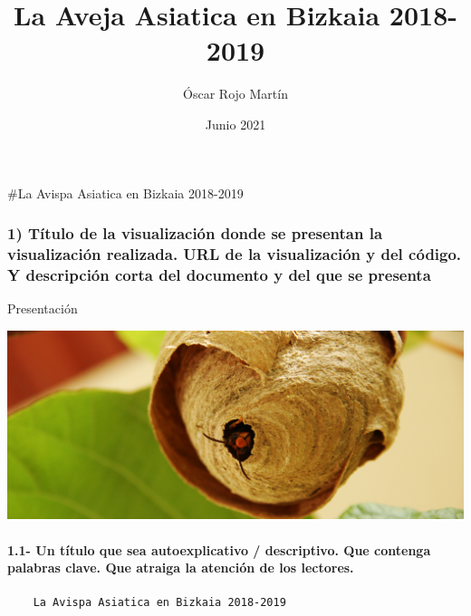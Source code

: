 \documentclass[
]{article}
\title{La Aveja Asiatica en Bizkaia 2018-2019}
\author{Óscar Rojo Martín}
\date{Junio 2021}
\begin{document}
\maketitle

\renewcommand*\contentsname{Índice}
{
\hypersetup{linkcolor=}
\setcounter{tocdepth}{5}
\tableofcontents
}
\newpage

\pagebreak

\#La Avispa Asiatica en Bizkaia 2018-2019

\hypertarget{tuxedtulo-de-la-visualizaciuxf3n-donde-se-presentan-la-visualizaciuxf3n-realizada.-url-de-la-visualizaciuxf3n-y-del-cuxf3digo.-y-descripciuxf3n-corta-del-documento-y-del-que-se-presenta}{%
\subsubsection{1) Título de la visualización donde se presentan la
visualización realizada. URL de la visualización y del código. Y
descripción corta del documento y del que se
presenta}\label{tuxedtulo-de-la-visualizaciuxf3n-donde-se-presentan-la-visualizaciuxf3n-realizada.-url-de-la-visualizaciuxf3n-y-del-cuxf3digo.-y-descripciuxf3n-corta-del-documento-y-del-que-se-presenta}}

Presentación

\includegraphics{Vespa/www/banner_vespas.jpg}

\hypertarget{un-tuxedtulo-que-sea-autoexplicativo-descriptivo.-que-contenga-palabras-clave.-que-atraiga-la-atenciuxf3n-de-los-lectores.}{%
\paragraph{1.1- Un título que sea autoexplicativo / descriptivo. Que
contenga palabras clave. Que atraiga la atención de los
lectores.}\label{un-tuxedtulo-que-sea-autoexplicativo-descriptivo.-que-contenga-palabras-clave.-que-atraiga-la-atenciuxf3n-de-los-lectores.}}

\begin{verbatim}
    La Avispa Asiatica en Bizkaia 2018-2019  
\end{verbatim}
\end{document}
